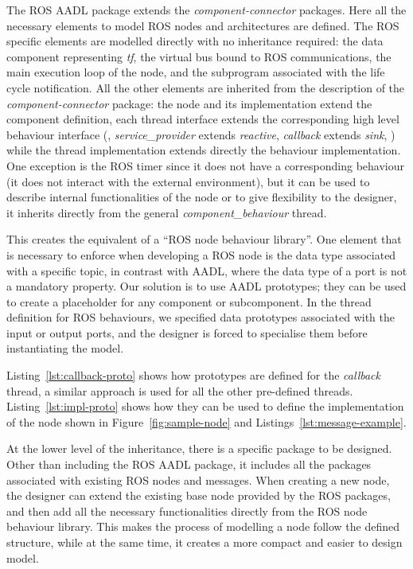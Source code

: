 The ROS AADL package extends the \textit{component-connector} packages. Here all the necessary elements to model ROS nodes and architectures are defined. The ROS specific elements are modelled directly with no inheritance required: the data component representing \textit{tf}, the virtual bus bound to ROS communications, the main execution loop of the node, and the subprogram associated with the life cycle notification. All the other elements are inherited from the description of the \textit{component-connector} package: the node and its implementation extend the component definition, each thread interface extends the corresponding high level behaviour interface (\eg, \textit{service\_provider} extends \textit{reactive}, \textit{callback} extends \textit{sink}, \etc) while the thread implementation extends directly the behaviour implementation. One exception is the ROS timer since it does not have a corresponding behaviour (it does not interact with the external environment), but it can be used to describe internal functionalities of the node or to give flexibility to the designer, it inherits directly from the general \textit{component\_behaviour} thread. 

This creates the equivalent of a ``ROS node behaviour library''. One element that is necessary to enforce when developing a ROS node is the data type associated with a specific topic, in contrast with AADL, where the data type of a port is not a mandatory property. Our solution is to use AADL prototypes; they can be used to create a placeholder for any component or subcomponent. In the thread definition for ROS behaviours, we specified data prototypes associated with the input or output ports, and the designer is forced to specialise them before instantiating the model.

Listing~\ref{lst:callback-proto} shows how prototypes are defined for the \textit{callback} thread, a similar approach is used for all the other pre-defined threads. Listing~\ref{lst:impl-proto} shows how they can be used to define the implementation of the node shown in Figure~\ref{fig:sample-node} and Listings~\ref{lst:message-example}.

At the lower level of the inheritance, there is a specific package to be designed. Other than including the ROS AADL package, it includes all the packages associated with existing ROS nodes and messages. When creating a new node, the designer can extend the existing base node provided by the ROS packages, and then add all the necessary functionalities directly from the ROS node behaviour library. This makes the process of modelling a node follow the defined structure, while at the same time, it creates a more compact and easier to design model. 

